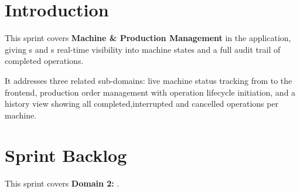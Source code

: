\section*{Introduction}

This sprint covers \textbf{Machine \& Production Management} in the  application, giving
s and s real-time visibility into machine
states and a full audit trail of completed operations.

It addresses three related sub-domains: live machine status tracking from
 to the  frontend, production order
management with operation lifecycle initiation, and a history view showing all
completed,interrupted and cancelled operations per machine.

\section{Sprint Backlog}

This sprint covers \textbf{Domain 2:}
\textbf{}.


